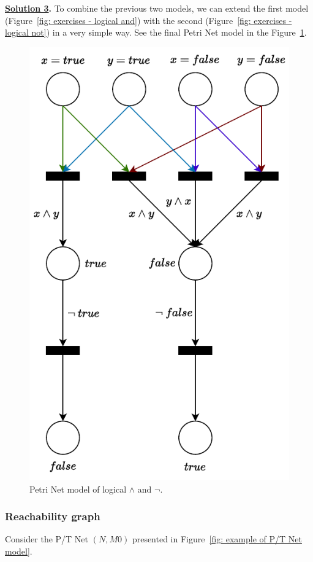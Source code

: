 \highspace
\textbf{\underline{Solution 3}.} To combine the previous two models, we can extend the first model (Figure~\ref{fig: exercises - logical and}) with the second (Figure~\ref{fig: exercises - logical not}) in a very simple way. See the final Petri Net model in the Figure~\ref{fig: exercises - logical and, not}.

\begin{figure}[!htp]
    \centering
    \includegraphics[width=.7\textwidth]{img/logical-and-3.pdf}
    \caption{Petri Net model of logical $\land$ and $\lnot$.}
    \label{fig: exercises - logical and, not}
\end{figure}

\newpage

\subsubsection{Reachability graph}

\descriptionproblem
Consider the P/T Net $\left(N, M0\right)$ presented in Figure~\ref{fig: example of P/T Net model}.

